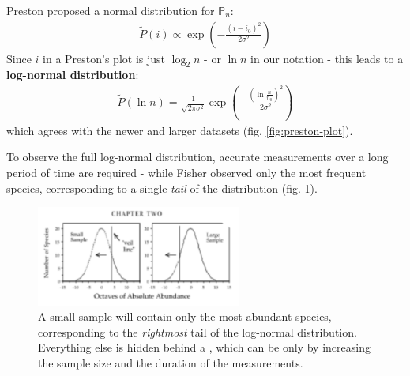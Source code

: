 \documentclass[../../main.tex]{subfiles}
\begin{document}
Preston proposed a normal distribution for $\mathbb{P}_n$:
\begin{align*}
    \tilde{P}(i) \propto \exp\left(-\frac{(i-i_0)^2}{2 \sigma^2} \right)
\end{align*}
Since $i$ in a Preston's plot is just $\log_2 n$ - or $\ln n$ in our notation - this leads to a \textbf{log-normal distribution}:
\begin{align}\label{eqn:log-normal-dist}
    \tilde{P}(\ln n) = \frac{1}{\sqrt{2 \pi \sigma^2}}  \exp\left(-\frac{\left(\ln \frac{n}{n_0} \right)^2}{2 \sigma^2} \right)
\end{align}
which agrees with the newer and larger datasets (fig. \ref{fig:preston-plot}).

\medskip

To observe the full log-normal distribution, accurate measurements over a long period of time are required - while Fisher observed only the most frequent species, corresponding to a single \textit{tail} of the distribution (fig. \ref{fig:tail}).

\begin{figure}[H]
    \centering
    \includegraphics[width=0.6\textwidth]{tail.png}
    \caption{A small sample will contain only the most abundant species, corresponding to the \textit{rightmost} tail of the log-normal distribution. Everything else is hidden behind a , which can be  only by increasing the sample size and the duration of the measurements.}
    \label{fig:tail}
\end{figure}
\end{document}
